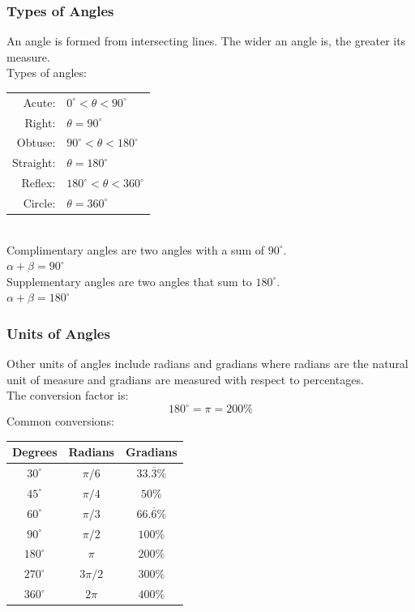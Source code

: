 \documentclass[11pt, fleqn]{article}
\begin{document}
\subsubsection{Types of Angles}
An angle is formed from intersecting lines. The wider an angle is, the greater its measure.\\
Types of angles:\\
\begin{tabular}{rl}
Acute: & $0^\circ <\theta < 90^\circ$\\
Right: & $\theta = 90^\circ$\\
Obtuse: & $90^\circ < \theta < 180^\circ$\\
Straight: & $\theta = 180^\circ$\\
Reflex: & $180^\circ < \theta < 360^\circ$\\
Circle: & $\theta=360^\circ$
\end{tabular}\\
Complimentary angles are two angles with a sum of $90^\circ$.\\
$\alpha+\beta=90^\circ$\\
Supplementary angles are two angles that sum to $180^\circ$.\\
$\alpha+\beta=180^\circ$

\subsubsection{Units of Angles}
Other units of angles include radians and gradians where radians are the natural unit of measure and gradians are measured with respect to percentages.\\
The conversion factor is:
$$180^\circ=\pi=200\%$$
Common conversions:\\
\begin{tabular}{c|c|c}
    Degrees & Radians & Gradians\\
    \hline
    $30^\circ$ & $\pi/6$ & $33.\overline{3}\%$\\
    $45^\circ$ & $\pi/4$ & $50\%$\\
    $60^\circ$ & $\pi/3$ & $66.\overline{6}\%$\\
    $90^\circ$ & $\pi/2$ & $100\%$\\
    $180^\circ$ & $\pi$ & $200\%$\\
    $270^\circ$ & $3\pi/2$ & $300\%$\\
    $360^\circ$ & $2\pi$ & $400\%$
\end{tabular}
\end{document}
